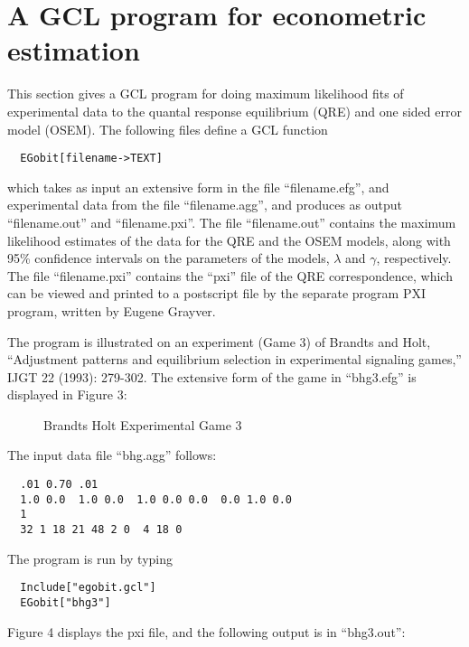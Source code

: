 \newpage
\section{A GCL program for econometric estimation}  

This section gives a GCL program for doing maximum likelihood fits of
experimental data to the quantal response equilibrium (QRE) and one
sided error model (OSEM).  The following files define a GCL function 

\begin{verbatim}
  EGobit[filename->TEXT] 
\end{verbatim}

\noindent
which takes as input an extensive form in the file ``filename.efg'',
and experimental data from the file ``filename.agg'', and produces as
output ``filename.out'' and ``filename.pxi''.  The file
``filename.out'' contains the maximum likelihood estimates of the data
for the QRE and the OSEM models, along with 95\% confidence intervals
on the parameters of the models, $\lambda$ and $\gamma$, respectively.
The file ``filename.pxi'' contains the ``pxi'' file of the QRE
correspondence, which can be viewed and printed to a postscript file
by the separate program PXI program, written by Eugene Grayver.  

The program is illustrated on an experiment (Game 3) of Brandts and
Holt, ``Adjustment patterns and equilibrium selection in experimental
signaling games,'' IJGT 22 (1993): 279-302.  The extensive form of the
game in ``bhg3.efg'' is displayed in Figure 3:

\begin{figure}[htp]
\centerline{}
\caption{Brandts Holt Experimental Game 3}
\end{figure}

\noindent
The input data file ``bhg.agg'' follows:

\begin{verbatim}
  .01 0.70 .01
  1.0 0.0  1.0 0.0  1.0 0.0 0.0  0.0 1.0 0.0 
  1
  32 1 18 21 48 2 0  4 18 0
\end{verbatim}

\noindent
The program is run by typing 

\begin{verbatim}
  Include["egobit.gcl"]
  EGobit["bhg3"]
\end{verbatim}

\noindent
Figure 4 displays the pxi file, and the following output is in
``bhg3.out'':

